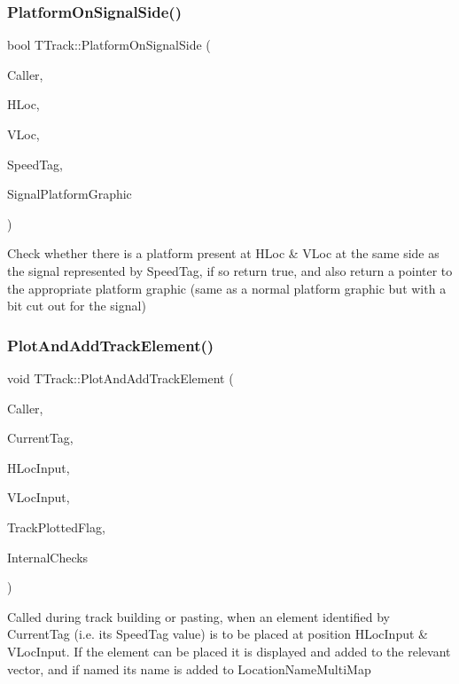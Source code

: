 \subsubsection{\texorpdfstring{Platform\+On\+Signal\+Side()}{PlatformOnSignalSide()}}
{\footnotesize\ttfamily bool T\+Track\+::\+Platform\+On\+Signal\+Side (\begin{DoxyParamCaption}\item[{int}]{Caller,  }\item[{int}]{H\+Loc,  }\item[{int}]{V\+Loc,  }\item[{int}]{Speed\+Tag,  }\item[{Graphics\+::\+T\+Bitmap $\ast$\&}]{Signal\+Platform\+Graphic }\end{DoxyParamCaption})}

Check whether there is a platform present at H\+Loc \& V\+Loc at the same side as the signal represented by Speed\+Tag, if so return true, and also return a pointer to the appropriate platform graphic (same as a normal platform graphic but with a bit cut out for the signal) \mbox{\label{class_t_track_a608674798cf48d88d614c8817566126e}} 
\subsubsection{\texorpdfstring{Plot\+And\+Add\+Track\+Element()}{PlotAndAddTrackElement()}}
{\footnotesize\ttfamily void T\+Track\+::\+Plot\+And\+Add\+Track\+Element (\begin{DoxyParamCaption}\item[{int}]{Caller,  }\item[{int}]{Current\+Tag,  }\item[{int}]{H\+Loc\+Input,  }\item[{int}]{V\+Loc\+Input,  }\item[{bool \&}]{Track\+Plotted\+Flag,  }\item[{bool}]{Internal\+Checks }\end{DoxyParamCaption})}

Called during track building or pasting, when an element identified by Current\+Tag (i.\+e. its Speed\+Tag value) is to be placed at position H\+Loc\+Input \& V\+Loc\+Input. If the element can be placed it is displayed and added to the relevant vector, and if named its name is added to Location\+Name\+Multi\+Map \mbox{\label{class_t_track_af56adb319c7003b8ddac8e55afaee3d2}} 
